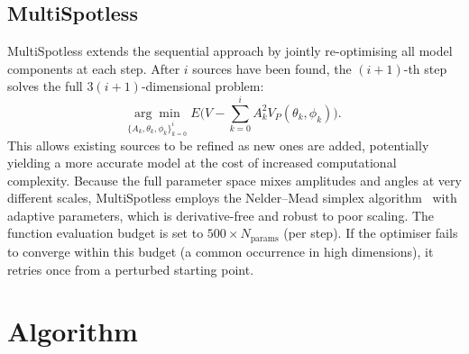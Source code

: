 \documentclass[a4paper,11pt]{article}
\begin{document}
\subsection{MultiSpotless}

MultiSpotless extends the sequential approach by jointly re-optimising
all model components at each step. After $i$ sources have been found,
the $(i+1)$-th step solves the full $3(i+1)$-dimensional problem:
%
\begin{equation}
	\underset{\{A_k,\theta_k,\phi_k\}_{k=0}^{i}}
	{\arg\min}\;
	E\bigl(V - \sum_{k=0}^{i} A_k^2 V_P(\theta_k, \phi_k)\bigr).
	\label{eq:multistep}
\end{equation}
%
This allows existing sources to be refined as new ones are added,
potentially yielding a more accurate model at the cost of increased
computational complexity. Because the full parameter space mixes
amplitudes and angles at very different scales, MultiSpotless employs
the Nelder--Mead simplex algorithm~\cite{nelder1965} with adaptive
parameters, which is derivative-free and robust to poor scaling.
The function evaluation budget is set to $500 \times N_{\text{params}}$
(per step). If the optimiser fails to converge within this budget
(a common occurrence in high dimensions), it retries once from a
perturbed starting point.

\section{Algorithm}
\end{document}

